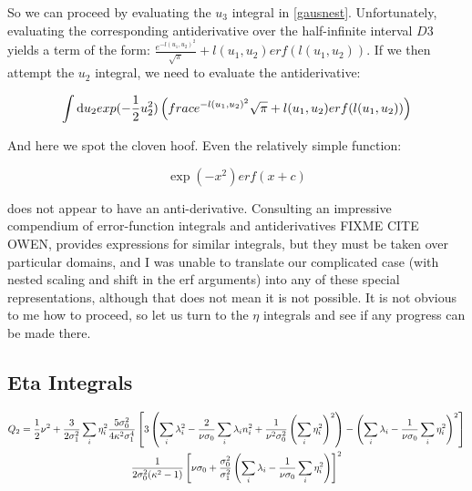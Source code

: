 \documentclass[10pt,letterpaper]{article}
\def\half{{1 \over 2}}
\def\d{{\rm d}}  %
\begin{document}
So we can proceed by evaluating the $u_3$ integral in \ref{gausnest}. Unfortunately, evaluating the corresponding antiderivative over the half-infinite interval $D3$ yields a term of the form: $\frac{e^{-l(u_1,u_2)^2}}{\sqrt{\pi}} + l(u_1,u_2) erf(l(u_1,u_2))$. If we then attempt the $u_2$ integral, we need to evaluate the antiderivative: 

\begin{equation*}
\int \d u_2 exp(-\frac{1}{2} u_2^2) \left(frac{e^{-l(u_1,u_2)^2}}{\sqrt{\pi}} + l(u_1,u_2) erf(l(u_1,u_2))\right)
\end{equation*}

And here we spot the cloven hoof. Even the relatively simple function:

\begin{equation} \label{eq:nonointegral}
\exp(-x^2) erf(x+c)
\end{equation}

does not appear to have an anti-derivative. Consulting an impressive compendium of error-function integrals and antiderivatives FIXME CITE OWEN, provides expressions for similar integrals, but they must be taken over particular domains, and I was unable to translate our complicated case (with nested scaling and shift in the erf arguments) into any of these special representations, although that does not mean it is not possible.
It is not obvious to me how to proceed, so let us turn to the $\eta$ integrals and see if any progress can be made there.

\subsection{Eta Integrals}


\begin{gather*}
Q_2 = \half \nu^2 + {3 \over 2 \sigma_1^2} \sum_{i} \nonumber
     \eta_{i}^2
     {5 \sigma_0^2 \over 4 \kappa^2 \sigma_1^4} \left[3
     \left( \sum_i \lambda_i^2 - {2 \over \nu \sigma_0} \sum_i
     \lambda_i  n_i^2 + {1 \over \nu^2 \sigma_0^2} \left(
     \sum_i \eta_i^2 \right)^2\right) - \left(\sum_i
     \lambda_i - {1 \over \nu \sigma_0} \sum_i \eta_i^2
     \right)^2\right]\\ 
     {1 \over 2 \sigma_0^2 (\kappa^2 - 1)}
     \left[\nu \sigma_0 + {\sigma_0^2 \over \sigma_1^2}
     \left(\sum_i \lambda_i - {1 \over \nu \sigma_0} \sum_i
     \eta_i^2 \right)\right]^2 \\ \nonumber
\end{gather*}
\end{document}
